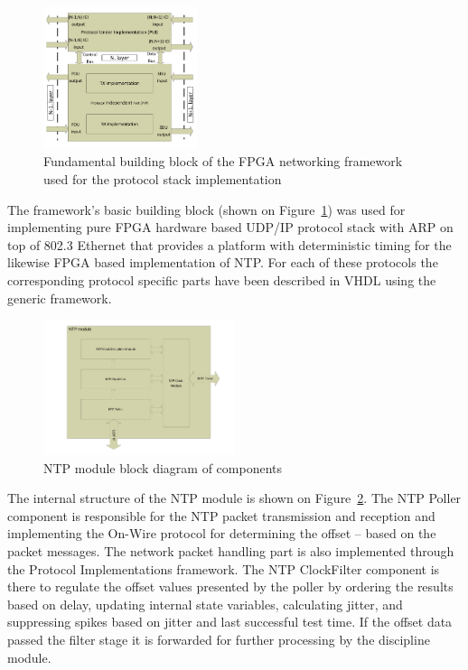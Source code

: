 \documentclass[journal]{IEEEtran}
\begin{document}
\begin{figure}[!htb]
    \centering
    \includegraphics[width=0.4\textwidth]{figures_raw/system_sketch.pdf}
    \caption{Fundamental building block of the FPGA networking framework used for the protocol stack implementation}
    \label{fig:system_sketch}
\end{figure}

The framework's basic building block (shown on Figure~\ref{fig:system_sketch}) was used for implementing pure FPGA
hardware based
UDP/IP protocol stack with ARP on top of 802.3 Ethernet that provides a platform with deterministic timing for the
likewise FPGA based
implementation of NTP. For each of these protocols the corresponding protocol specific parts have been described in
VHDL using the generic framework.

\begin{figure}[!htb]
    \centering
    \includegraphics[width=0.5\textwidth]{figures_raw/ntp-sketch.pdf}
    \caption{NTP module block diagram of components}
    \label{fig:ntp-impl}
\end{figure}

The internal structure of the NTP module is shown on Figure~\ref{fig:ntp-impl}. The NTP Poller component is responsible
for the NTP packet transmission and reception and implementing the On-Wire protocol
for determining the offset  -- based on the packet messages. The network packet handling part is also implemented
through the Protocol Implementations framework. The NTP ClockFilter component is there to regulate the offset values
presented by the poller by ordering the results based on delay, updating internal state variables, calculating jitter,
and
suppressing spikes based on jitter and last successful test time. If the offset data passed the filter stage it is
forwarded for further processing by the discipline module.
\end{document}
